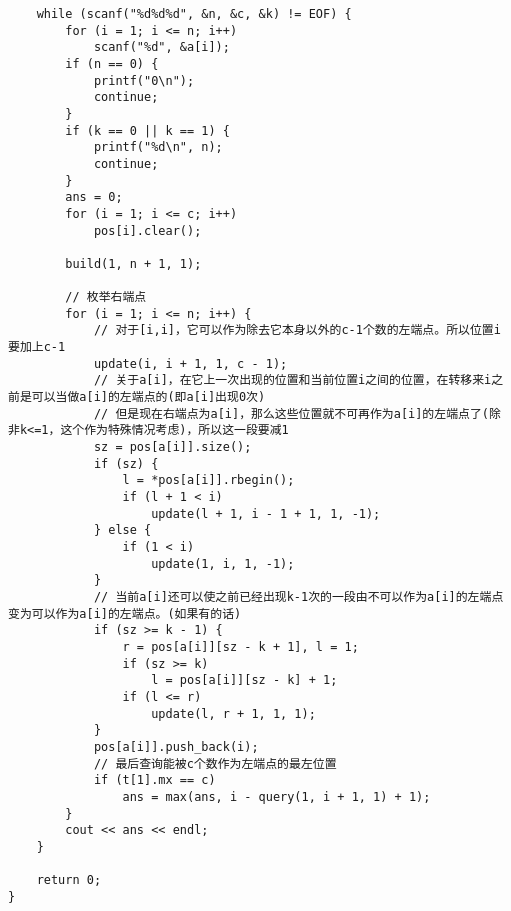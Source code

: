 \begin{lstlisting}
    while (scanf("%d%d%d", &n, &c, &k) != EOF) {
        for (i = 1; i <= n; i++)
            scanf("%d", &a[i]);
        if (n == 0) {
            printf("0\n");
            continue;
        }
        if (k == 0 || k == 1) {
            printf("%d\n", n);
            continue;
        }
        ans = 0;
        for (i = 1; i <= c; i++)
            pos[i].clear();

        build(1, n + 1, 1);

        // 枚举右端点
        for (i = 1; i <= n; i++) {
            // 对于[i,i]，它可以作为除去它本身以外的c-1个数的左端点。所以位置i要加上c-1
            update(i, i + 1, 1, c - 1);
            // 关于a[i]，在它上一次出现的位置和当前位置i之间的位置，在转移来i之前是可以当做a[i]的左端点的(即a[i]出现0次)
            // 但是现在右端点为a[i]，那么这些位置就不可再作为a[i]的左端点了(除非k<=1，这个作为特殊情况考虑)，所以这一段要减1
            sz = pos[a[i]].size();
            if (sz) {
                l = *pos[a[i]].rbegin();
                if (l + 1 < i)
                    update(l + 1, i - 1 + 1, 1, -1);
            } else {
                if (1 < i)
                    update(1, i, 1, -1);
            }
            // 当前a[i]还可以使之前已经出现k-1次的一段由不可以作为a[i]的左端点变为可以作为a[i]的左端点。(如果有的话)
            if (sz >= k - 1) {
                r = pos[a[i]][sz - k + 1], l = 1;
                if (sz >= k)
                    l = pos[a[i]][sz - k] + 1;
                if (l <= r)
                    update(l, r + 1, 1, 1);
            }
            pos[a[i]].push_back(i);
            // 最后查询能被c个数作为左端点的最左位置
            if (t[1].mx == c)
                ans = max(ans, i - query(1, i + 1, 1) + 1);
        }
        cout << ans << endl;
    }

    return 0;
}
\end{lstlisting}
